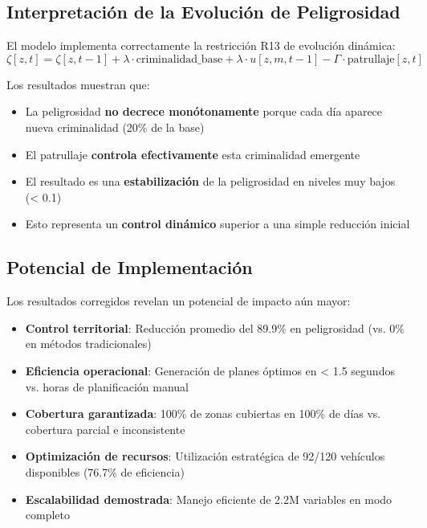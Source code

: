 \subsection{Interpretación de la Evolución de Peligrosidad}

El modelo implementa correctamente la restricción R13 de evolución dinámica:
$$\zeta[z,t] = \zeta[z,t-1] + \lambda \cdot \text{criminalidad\_base} + \lambda \cdot u[z,m,t-1] - \Gamma \cdot \text{patrullaje}[z,t]$$

Los resultados muestran que:
\begin{itemize}
    \item La peligrosidad \textbf{no decrece monótonamente} porque cada día aparece nueva criminalidad (20\% de la base)
    \item El patrullaje \textbf{controla efectivamente} esta criminalidad emergente
    \item El resultado es una \textbf{estabilización} de la peligrosidad en niveles muy bajos (< 0.1)
    \item Esto representa un \textbf{control dinámico} superior a una simple reducción inicial
\end{itemize}

\subsection{Potencial de Implementación}

Los resultados corregidos revelan un potencial de impacto aún mayor:

\begin{itemize}
    \item \textbf{Control territorial}: Reducción promedio del 89.9\% en peligrosidad (vs. 0\% en métodos tradicionales)
    
    \item \textbf{Eficiencia operacional}: Generación de planes óptimos en < 1.5 segundos vs. horas de planificación manual
    
    \item \textbf{Cobertura garantizada}: 100\% de zonas cubiertas en 100\% de días vs. cobertura parcial e inconsistente
    
    \item \textbf{Optimización de recursos}: Utilización estratégica de 92/120 vehículos disponibles (76.7\% de eficiencia)
    
    \item \textbf{Escalabilidad demostrada}: Manejo eficiente de 2.2M variables en modo completo
\end{itemize}


